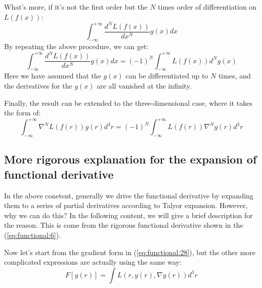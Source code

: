 What's more, if it's not the first order but the $N$ times order of
differentiation on $L(f(x))$:
\begin{equation}
 \int^{+\infty}_{-\infty}\frac{d^{N} L(f(x))}{dx^{N}} g(x) dx 
\end{equation} 
By repeating the above procedure, we can get:
\begin{equation}
  \int^{+\infty}_{-\infty}\frac{d^{N} L(f(x))}{dx^{N}} g(x) dx  =
(-1)^{N} \int^{+\infty}_{-\infty} L(f(x)) d^{N}g(x)
\end{equation} 
Here we have assumed that the $g(x)$ can be differentiated up to $N$
times, and the derivatives for the $g(x)$ are all vanished at the
infinity.

Finally, the result can be extended to the three-dimensional case,
where it takes the form of:
\begin{equation}
 \label{eq:integration_rule_functional}
  \int^{+\infty}_{-\infty}\nabla^{N}L(f(r)) g(r) d^{3}r  =
(-1)^{N} \int^{+\infty}_{-\infty} L(f(r)) \nabla^{N}g(r) d^{3}r
\end{equation} 

\subsection{More rigorous explanation for the expansion of functional
derivative}
%
%
%
%
In the above conetent, generally we drive the functional derivative
by expanding them to a series of partial derivatives according to
Talyor expansion. However, why we can do this? In the following
content, we will give a brief description for the reason. This is
come from the rigorous functional derivative shown in the
(\ref{eq:functional:6}). 

Now let's start from the gradient form in (\ref{eq:functional:28}),
but the other more complicated expressions are actually using the
same way:
\begin{equation}
   F[y(r)] = \int L(r, y(r), \nabla y(r)) d^{3}r
\end{equation}


